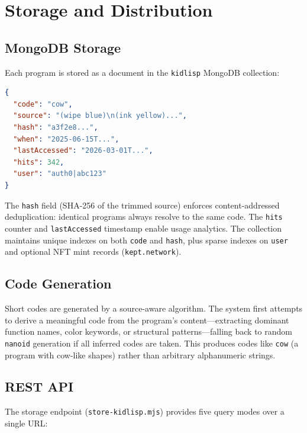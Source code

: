 \documentclass[10pt,letterpaper,twocolumn]{article}
\begin{document}
\section{Storage and Distribution}
\label{sec:infrastructure}

\subsection{MongoDB Storage}

Each program is stored as a document in the \texttt{kidlisp} MongoDB collection:

\begin{lstlisting}[language=json]
{
  "code": "cow",
  "source": "(wipe blue)\n(ink yellow)...",
  "hash": "a3f2e8...",
  "when": "2025-06-15T...",
  "lastAccessed": "2026-03-01T...",
  "hits": 342,
  "user": "auth0|abc123"
}
\end{lstlisting}

The \texttt{hash} field (SHA-256 of the trimmed source) enforces content-addressed deduplication: identical programs always resolve to the same code. The \texttt{hits} counter and \texttt{lastAccessed} timestamp enable usage analytics. The collection maintains unique indexes on both \texttt{code} and \texttt{hash}, plus sparse indexes on \texttt{user} and optional NFT mint records (\texttt{kept.network}).

\subsection{Code Generation}

Short codes are generated by a source-aware algorithm. The system first attempts to derive a meaningful code from the program's content---extracting dominant function names, color keywords, or structural patterns---falling back to random \texttt{nanoid} generation if all inferred codes are taken. This produces codes like \texttt{cow} (a program with cow-like shapes) rather than arbitrary alphanumeric strings.

\subsection{REST API}

The storage endpoint (\texttt{store-kidlisp.mjs}) provides five query modes over a single URL:
\end{document}
